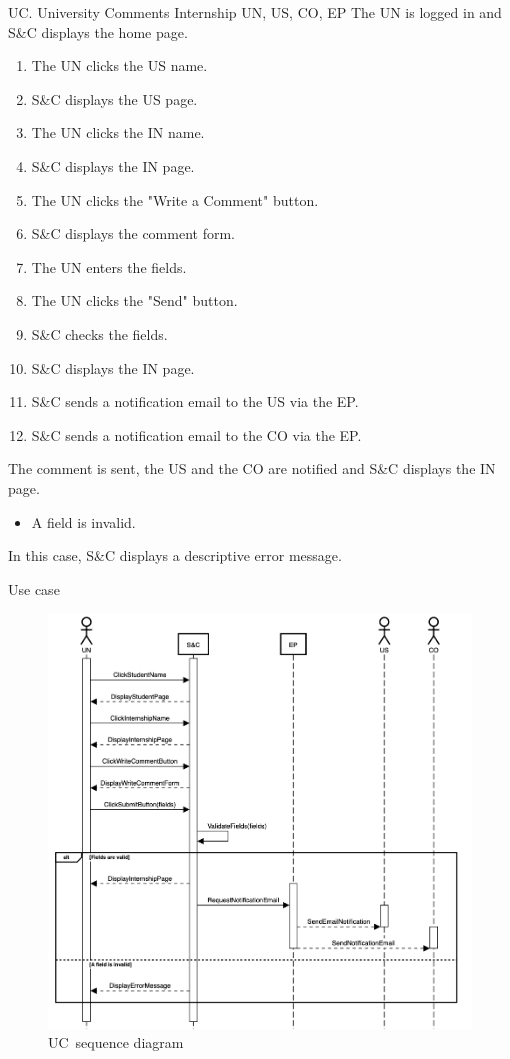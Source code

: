 \clearpage
\begin{usecase}
    {UC\theuc. University Comments Internship}
    {UN, US, CO, EP}
    {The UN is logged in and S\&C displays the home page.}
    {\begin{enumerate}[leftmargin=*]
        \item The UN clicks the US name.
        \item S\&C displays the US page.
        \item The UN clicks the IN name.
        \item S\&C displays the IN page.
        \item The UN clicks the "Write a Comment" button.
        \item S\&C displays the comment form.
        \item The UN enters the fields.
        \item The UN clicks the "Send" button.
        \item S\&C checks the fields.
        \item S\&C displays the IN page.
        \item S\&C sends a notification email to the US via the EP.
        \item S\&C sends a notification email to the CO via the EP.
    \end{enumerate}}
    {The comment is sent, the US and the CO are notified and S\&C displays the IN page.}
    {\begin{itemize}[leftmargin=*, label=\tiny\textbullet]
        \item A field is invalid.
    \end{itemize}
    In this case, S\&C displays a descriptive error message.}
    {Use case \theuc}
\end{usecase}

\begin{figure}[h]
    \centering
    \includegraphics[width=16cm]{images/sequence-diagrams/university-comments-internship.png}
    \caption{UC\theuc\ sequence diagram}
\end{figure}

\clearpage
